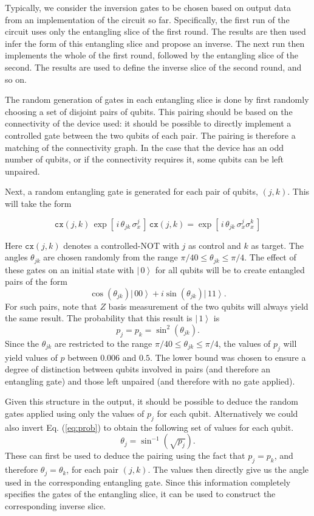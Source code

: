 \documentclass[aps,prl,twocolumn,showpacs,preprintnumbers]{revtex4-1}
\newcommand{\be}{\begin{equation}}
\newcommand{\ee}{\end{equation}}
\newcommand{\ket}[1]{\left | \, #1 \right\rangle}
\begin{document}
Typically, we consider the inversion gates to be chosen based on output data from an implementation of the circuit so far. Specifically, the first run of the circuit uses only the entangling slice of the first round. The results are then used infer the form of this entangling slice and propose an inverse. The next run then implements the whole of the first round, followed by the entangling slice of the second. The results are used to define the inverse slice of the second round, and so on.

The random generation of gates in each entangling slice is done by first randomly choosing a set of disjoint pairs of qubits. This pairing should be based on the connectivity of the device used: it should be possible to directly implement a controlled gate between the two qubits of each pair. The pairing is therefore a matching of the connectivity graph. In the case that the device has an odd number of qubits, or if the connectivity requires it, some qubits can be left unpaired.

Next, a random entangling gate is generated for each pair of qubits, $(j,k)$. This will take the form

\be
\mathtt{cx} (j,k) \, \exp [ \, i \, \theta_{jk} \, \sigma^j_x \, ] \, \mathtt{cx}(j,k) = \exp [ \, i \, \theta_{jk} \, \sigma^j_x \sigma^k_x \, ]
\ee

Here $\mathtt{cx}(j,k)$ denotes a controlled-NOT with $j$ as control and $k$ as target. The angles $\theta_{jk}$ are chosen randomly from the range $\pi/40 \leq \theta_{jk} \leq \pi/4$. The effect of these gates on an initial state with $\ket{0}$ for all qubits will be to create entangled pairs of the form
\be \label{state}
\cos (\theta_{jk}) \ket{00} + i \sin (\theta_{jk}) \ket{11} .
\ee
For such pairs, note that $Z$ basis measurement of the two qubits will always yield the same result. The probability that this result is $\ket{1}$ is
\be \label{eq:prob}
p_j = p_k = \sin^2 (\theta_{jk}).
\ee
Since the $\theta_{jk}$ are restricted to the range $\pi/40 \leq \theta_{jk} \leq \pi/4$, the values of $p_j$ will yield values of $p$ between $0.006$ and $0.5$. The lower bound was chosen to ensure a degree of distinction between qubits involved in pairs (and therefore an entangling gate) and those left unpaired (and therefore with no gate applied).

Given this structure in the output, it should be possible to deduce the random gates applied using only the values of $p_j$ for each qubit. Alternatively we could also invert Eq. (\ref{eq:prob}) to obtain the following set of values for each qubit.
\be \label{angle}
\theta_j = \sin^{-1}( \sqrt{p_j} ).
\ee
These can first be used to deduce the pairing using the fact that $p_j=p_k$, and therefore $\theta_j=\theta_k$, for each pair $(j,k)$. The values then directly give us the angle used in the corresponding entangling gate. Since this information completely specifies the gates of the entangling slice, it can be used to construct the corresponding inverse slice.
\end{document}
